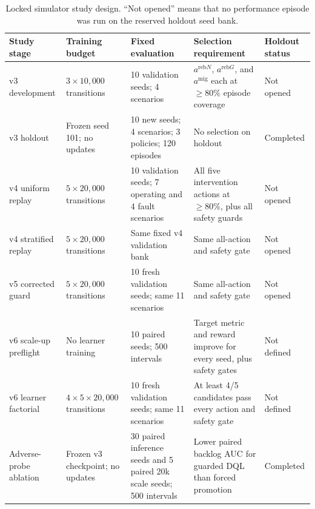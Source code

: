 \begin{table}[!htbp]
  \caption{Locked simulator study design.  ``Not opened'' means that no
  performance episode was run on the reserved holdout seed bank.}
  \label{tab:locked-study-design}
  \centering
  \small
  \begin{tabular}{p{}p{}p{}p{}p{}}
    \toprule
    Study stage & Training budget & Fixed evaluation & Selection requirement & Holdout status \\
    \midrule
    v3 development & $3\times10{,}000$ transitions & 10 validation seeds; 4 scenarios & $a^{\mathrm{reb}N}$, $a^{\mathrm{reb}G}$, and $a^{\mathrm{mig}}$ each at $\geq80\%$ episode coverage & Not opened \\
    v3 holdout & Frozen seed 101; no updates & 10 new seeds; 4 scenarios; 3 policies; 120 episodes & No selection on holdout & Completed \\
    v4 uniform replay & $5\times20{,}000$ transitions & 10 validation seeds; 7 operating and 4 fault scenarios & All five intervention actions at $\geq80\%$, plus all safety guards & Not opened \\
    v4 stratified replay & $5\times20{,}000$ transitions & Same fixed v4 validation bank & Same all-action and safety gate & Not opened \\
    v5 corrected guard & $5\times20{,}000$ transitions & 10 fresh validation seeds; same 11 scenarios & Same all-action and safety gate & Not opened \\
    v6 scale-up preflight & No learner training & 10 paired seeds; 500 intervals & Target metric and reward improve for every seed, plus safety gates & Not defined \\
    v6 learner factorial & $4\times5\times20{,}000$ transitions & 10 fresh validation seeds; same 11 scenarios & At least 4/5 candidates pass every action and safety gate & Not defined \\
    Adverse-probe ablation & Frozen v3 checkpoint; no updates & 30 paired inference seeds and 5 paired 20k scale seeds; 500 intervals & Lower paired backlog AUC for guarded DQL than forced promotion & Completed \\
    \bottomrule
  \end{tabular}
\end{table}

